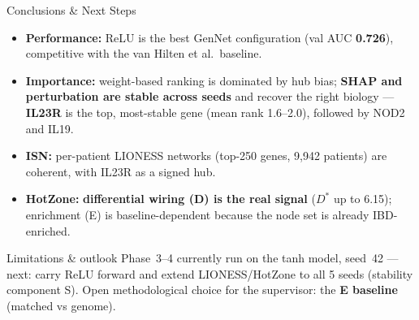 \documentclass[aspectratio=169]{beamer}
\begin{document}
\begin{frame}{Conclusions \& Next Steps}
    \begin{itemize}
        \item \textbf{Performance:} ReLU is the best GenNet configuration (val AUC \textbf{0.726}), competitive
              with the van Hilten et al.\ baseline.
        \item \textbf{Importance:} weight-based ranking is dominated by hub bias; \textbf{SHAP and
              perturbation are stable across seeds} and recover the right biology --- \textbf{IL23R} is the
              top, most-stable gene (mean rank 1.6--2.0), followed by NOD2 and IL19.
        \item \textbf{ISN:} per-patient LIONESS networks (top-250 genes, 9{,}942 patients) are coherent,
              with IL23R as a signed hub.
        \item \textbf{HotZone:} \textbf{differential wiring (D) is the real signal} ($D^*$ up to 6.15);
              enrichment (E) is baseline-dependent because the node set is already IBD-enriched.
    \end{itemize}
    \vspace{0.2cm}
    \begin{block}{Limitations \& outlook}
        \footnotesize
        Phase~3--4 currently run on the tanh model, seed~42 --- next: carry ReLU forward and extend
        LIONESS/HotZone to all 5 seeds (stability component S). Open methodological choice for the
        supervisor: the \textbf{E baseline} (matched vs genome).
    \end{block}
\end{frame}
\end{document}
